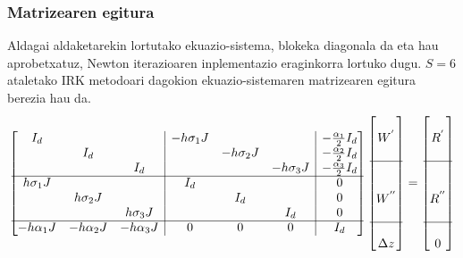 \subsubsection*{Matrizearen egitura}

 Aldagai aldaketarekin lortutako ekuazio-sistema, blokeka diagonala da eta hau aprobetxatuz, Newton iterazioaren inplementazio eraginkorra lortuko dugu. $S=6$ ataletako IRK metodoari dagokion ekuazio-sistemaren matrizearen egitura berezia hau da.    
\begin{equation*}
\label{eq:sysmat}
\begin{bmatrix}
 I_d        &             &                     & \multicolumn{1}{|c}{-h\sigma_1 J} &            &                  &\multicolumn{1}{|c}{-\frac{\alpha_1}{2} I_d}\\
            & I_d         &                     & \multicolumn{1}{|c}{}           & -h\sigma_2 J &                
 &\multicolumn{1}{|c}{-\frac{\alpha_2}{2} I_d}\\
            &             & I_d                 & \multicolumn{1}{|c}{}           &            & -h\sigma_3 J  
 &\multicolumn{1}{|c}{-\frac{\alpha_3}{2} I_d}\\\cline{1-7}    
h\sigma_1 J &             &                     & \multicolumn{1}{|c}{I_d}        &            &            
 &\multicolumn{1}{|c}{0}\\
            & h\sigma_2 J &                     & \multicolumn{1}{|c}{}           &  I_d       &             
 &\multicolumn{1}{|c}{0}\\
            &             &  h\sigma_3 J        & \multicolumn{1}{|c}{}           &            &  I_d        
 &\multicolumn{1}{|c}{0}\\\cline{1-7}
 -h\alpha_1 J       & -h\alpha_2 J              &  -h\alpha_3 J                    & \multicolumn{1}{|c}{$0$}        &  $0$       &  $0$         
 &\multicolumn{1}{|c}{ I_d}\\
\end{bmatrix}
\begin{bmatrix}
         \\
 W^{'} \\
    \\
\cline{1-1} \\
    \\
 W^{''}   \\
    \\
    \cline{1-1} \\
 \Delta z  \\
\end{bmatrix}=
\begin{bmatrix}
         \\
 R^{'} \\
    \\
\cline{1-1} \\
    \\
 R^{''}   \\
    \\
    \cline{1-1} \\
 0  \\
\end{bmatrix}
\end{equation*} 
